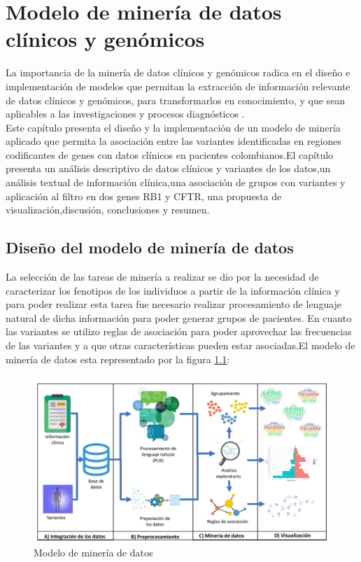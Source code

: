 \chapter{Modelo de minería de datos clínicos y genómicos}

La importancia de la minería de datos clínicos y genómicos radica en el diseño e implementación de modelos que permitan la extracción de información relevante de datos clínicos y genómicos, para transformarlos en conocimiento, y que sean aplicables a las investigaciones y procesos diagnósticos \cite{Farid2016}. \\  

Este capítulo presenta el diseño y la implementación de un modelo de minería aplicado que permita la asociación entre las variantes identificadas en regiones codificantes de genes con datos clínicos en pacientes colombianos.El capítulo presenta un análisis descriptivo de datos clínicos y variantes de los datos,un análisis textual de información clínica,una asociación de grupos con variantes y aplicación al filtro en dos genes RB1 y CFTR, una propuesta de visualización,discusión, conclusiones y resumen. 

\section{Diseño del modelo de minería de datos}

La selección de las tareas de minería a realizar se dio por la necesidad de caracterizar los fenotipos de los individuos a partir de la información clínica y para poder realizar esta tarea fue necesario realizar procesamiento de lenguaje natural de dicha información para poder generar grupos de pacientes. En cuanto las variantes se utilizo reglas de asociación para poder aprovechar las frecuencias de las variantes y a que otras características pueden estar asociadas.El modelo de minería de datos esta representado por la figura  \ref{fig:kdd}:\\

\begin{figure}[]
	\centering
	\includegraphics[width=1\textwidth]{Kap4/KDDtesis.pdf}
	\caption{Modelo de minería de datos}
	\label{fig:kdd}
\end{figure}


